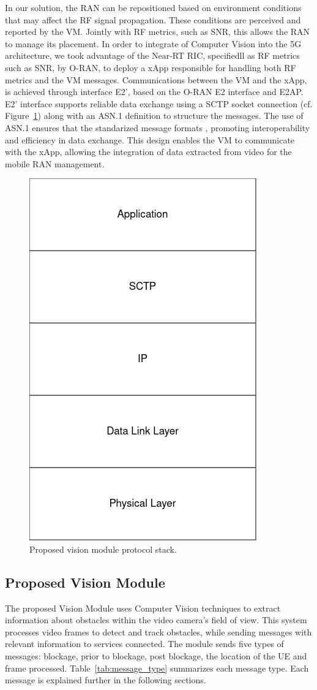 In our solution, the RAN can be repositioned based on environment conditions that may affect the RF signal propagation\@.
These conditions are perceived and reported by the VM.
Jointly with RF metrics, such as SNR, this allows the RAN to manage its placement.
In order to integrate of Computer Vision into the 5G architecture, we took advantage of the Near-RT RIC, specifiedll as RF metrics such as SNR, by O-RAN, to deploy a xApp responsible for handling both RF metrics and the VM messages.
Communications between the VM and the xApp, is achieved through interface E2', based on the O-RAN E2 interface and E2AP\@.
E2' interface supports reliable data exchange using a SCTP socket connection (cf.
Figure~\ref{fig:stack}) along with an ASN.1 definition to structure the messages.
The use of ASN.1 ensures that the standarized message formats , promoting interoperability and efficiency in data exchange.
This design enables the VM to communicate with the xApp, allowing the integration of data extracted from video for the mobile RAN management.

\begin{figure}[H]
    \centering
    \includegraphics[width=0.2\linewidth]{figures/VisionModule_ProtocolStack.drawio(2)}
    \caption[Proposed Vision Module Protocol Stack]{Proposed vision module protocol stack.}
    \label{fig:stack}
\end{figure}


\subsection{Proposed Vision Module}\label{subsec:prop_vision}
The proposed Vision Module uses Computer Vision techniques to extract information about obstacles within the video camera's field of view.
This system processes video frames to detect and track obstacles, while sending messages with relevant information to services connected.
The module sends five types of messages: blockage, prior to blockage, post blockage, the location of the UE and frame processed.
Table~\ref{tab:message_type} summarizes each message type.
Each message is explained further in the following sections.

